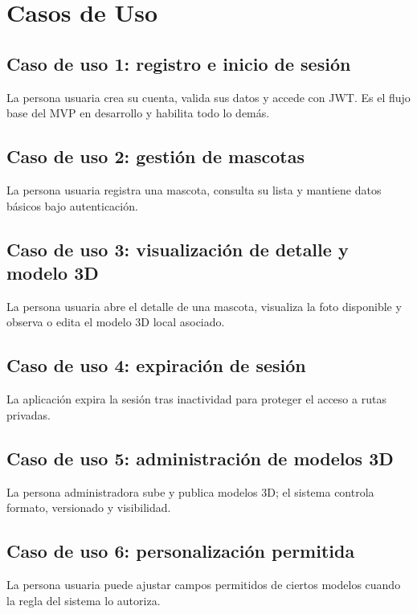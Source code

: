 \section{Casos de Uso}
\subsection{Caso de uso 1: registro e inicio de sesi\'on}
La persona usuaria crea su cuenta, valida sus datos y accede con JWT. Es el flujo base del MVP en desarrollo y habilita todo lo dem\'as.

\subsection{Caso de uso 2: gesti\'on de mascotas}
La persona usuaria registra una mascota, consulta su lista y mantiene datos b\'asicos bajo autenticaci\'on.

\subsection{Caso de uso 3: visualizaci\'on de detalle y modelo 3D}
La persona usuaria abre el detalle de una mascota, visualiza la foto disponible y observa o edita el modelo 3D local asociado.

\subsection{Caso de uso 4: expiraci\'on de sesi\'on}
La aplicaci\'on expira la sesi\'on tras inactividad para proteger el acceso a rutas privadas.

\subsection{Caso de uso 5: administraci\'on de modelos 3D}
La persona administradora sube y publica modelos 3D; el sistema controla formato, versionado y visibilidad.

\subsection{Caso de uso 6: personalizaci\'on permitida}
La persona usuaria puede ajustar campos permitidos de ciertos modelos cuando la regla del sistema lo autoriza.

